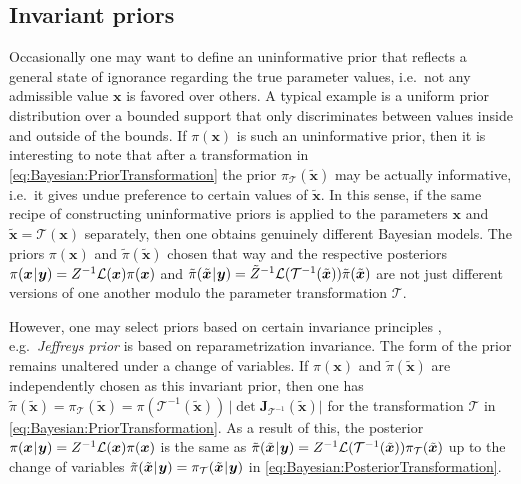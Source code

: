 \subsection{Invariant priors}
Occasionally one may want to define an uninformative prior that reflects a general state of ignorance regarding the true parameter values,
i.e.\ not any admissible value \(\bm{x}\) is favored over others.
A typical example is a uniform prior distribution over a bounded support that only discriminates between values inside and outside of the bounds.
If \(\pi(\bm{x})\) is such an uninformative prior, then it is interesting to note that after a transformation in \cref{eq:Bayesian:PriorTransformation}
the prior \(\pi_{\mathcal{T}}(\tilde{\bm{x}})\) may be actually informative, i.e.\ it gives undue preference to certain values of \(\tilde{\bm{x}}\).
In this sense, if the same recipe of constructing uninformative priors is applied to the parameters \(\bm{x}\) and \(\tilde{\bm{x}} = \mathcal{T}(\bm{x})\) separately,
then one obtains genuinely different Bayesian models.
The priors \(\pi(\bm{x})\) and \(\tilde{\pi}(\tilde{\bm{x}})\) chosen that way
and the respective posteriors \(\pi(\bm{x} {\:\!}|{\:\!} \bm{y}) = Z^{-1} \mathcal{L}(\bm{x}) \pi(\bm{x})\) and
\(\tilde{\pi}(\tilde{\bm{x}} {\:\!}|{\:\!} \bm{y}) = \tilde{Z}^{-1} \mathcal{L}(\mathcal{T}^{-1}(\tilde{\bm{x}})) \tilde{\pi}(\tilde{\bm{x}})\)
are not just different versions of one another modulo the parameter transformation \(\mathcal{T}\).
\par %
However, one may select priors based on certain invariance principles \cite{Bayesian:Harney2016}, e.g.\ \emph{Jeffreys prior} \cite{Bayesian:Jeffreys1946} is based on reparametrization invariance.
The form of the prior remains unaltered under a change of variables.
If \(\pi(\bm{x})\) and \(\tilde{\pi}(\tilde{\bm{x}})\) are independently chosen as this invariant prior,
then one has \(\tilde{\pi}(\tilde{\bm{x}}) = \pi_{\mathcal{T}}(\tilde{\bm{x}}) = \pi(\mathcal{T}^{-1}(\tilde{\bm{x}})) \, \lvert \det \bm{J}_{\mathcal{T}^{-1}}(\tilde{\bm{x}})\rvert\)
for the transformation \(\mathcal{T}\) in \cref{eq:Bayesian:PriorTransformation}.
As a result of this, the posterior \(\pi(\bm{x} {\:\!}|{\:\!} \bm{y}) = Z^{-1} \mathcal{L}(\bm{x}) \pi(\bm{x})\)
is the same as \(\tilde{\pi}(\tilde{\bm{x}} {\:\!}|{\:\!} \bm{y}) = Z^{-1} \mathcal{L}(\mathcal{T}^{-1}(\tilde{\bm{x}})) \pi_{\mathcal{T}}(\tilde{\bm{x}})\) up to the change of variables
\(\tilde{\pi}(\tilde{\bm{x}} {\:\!}|{\:\!} \bm{y}) = \pi_{\mathcal{T}}(\tilde{\bm{x}} {\:\!}|{\:\!} \bm{y})\) in \cref{eq:Bayesian:PosteriorTransformation}.

